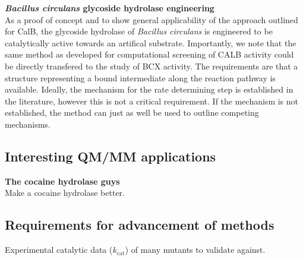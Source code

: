 \textbf{\textit{Bacillus circulans} glycoside hydrolase engineering}\\
As a proof of concept and to show general applicability of the approach outlined for CalB, the glycoside hydrolase of \textit{Bacillus circulans} is engineered to be catalytically active towards an artifical substrate.
Importantly, we note that the same method as developed for computational screening of CALB activity could be directly transfered to the study of BCX activity.
The requirements are that a structure representing a bound intermediate along the reaction pathway is available.
Ideally, the mechanism for the rate determining step is established in the literature, however this is not a critical requirement.
If the mechanism is not established, the method can just as well be used to outline competing mechanisms.

\subsection{Interesting QM/MM applications}
\textbf{The cocaine hydrolase guys}\\
Make a cocaine hydrolase better\cite{gao2006computational}.

\subsection{Requirements for advancement of methods}
Experimental catalytic data ($k_\text{cat}$) of many mutants to validate against.
